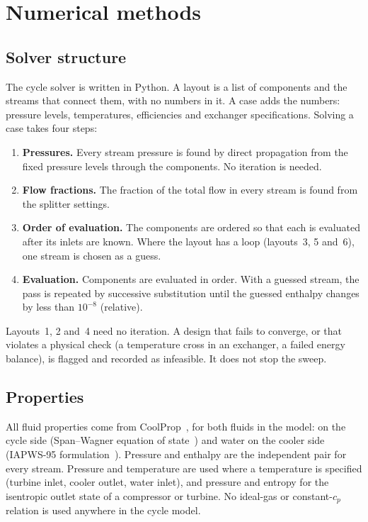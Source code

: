 \section{Numerical methods}\label{app:numerics}

\subsection{Solver structure}
The cycle solver is written in Python. A layout is a list of components and the streams that connect them, with no numbers in it. A case adds the numbers: pressure levels, temperatures, efficiencies and exchanger specifications. Solving a case takes four steps:
\begin{enumerate}
  \item \textbf{Pressures.} Every stream pressure is found by direct propagation from the fixed pressure levels through the components. No iteration is needed.
  \item \textbf{Flow fractions.} The fraction of the total flow in every stream is found from the splitter settings.
  \item \textbf{Order of evaluation.} The components are ordered so that each is evaluated after its inlets are known. Where the layout has a loop (layouts~3, 5 and~6), one stream is chosen as a guess.
  \item \textbf{Evaluation.} Components are evaluated in order. With a guessed stream, the pass is repeated by successive substitution until the guessed enthalpy changes by less than $10^{-8}$ (relative).
\end{enumerate}
Layouts~1, 2 and~4 need no iteration. A design that fails to converge, or that violates a physical check (a temperature cross in an exchanger, a failed energy balance), is flagged and recorded as infeasible. It does not stop the sweep.


\subsection{Properties}
All fluid properties come from CoolProp~\cite{coolprop}, for both fluids in the model: \cotwo{} on the cycle side (Span--Wagner equation of state~\cite{spanwagner}) and water on the cooler side (IAPWS-95 formulation~\cite{iapws}). Pressure and enthalpy are the independent pair for every stream. Pressure and temperature are used where a temperature is specified (turbine inlet, cooler outlet, water inlet), and pressure and entropy for the isentropic outlet state of a compressor or turbine. No ideal-gas or constant-$c_p$ relation is used anywhere in the cycle model.

